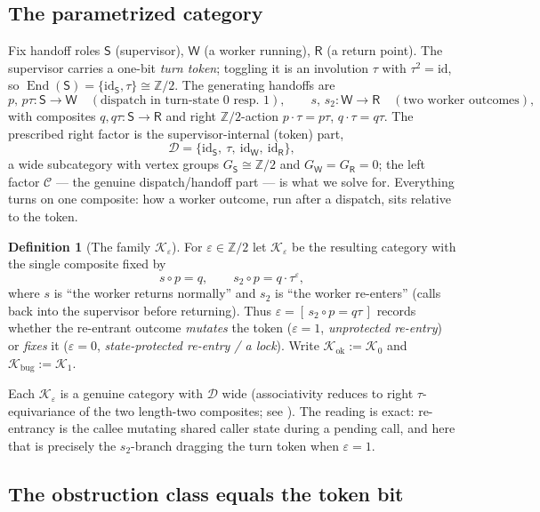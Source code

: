 \documentclass[11pt]{amsart}
\theoremstyle{definition}
\newtheorem{definition}[theorem]{Definition}
\theoremstyle{remark}
\newcommand{\End}{\operatorname{End}}
\newcommand{\id}{\mathrm{id}}
\newcommand{\C}{\mathcal{C}}
\newcommand{\D}{\mathcal{D}}
\newcommand{\K}{\mathcal{K}}
\newcommand{\Sup}{\mathsf{S}}
\newcommand{\Wk}{\mathsf{W}}
\newcommand{\Rt}{\mathsf{R}}
\begin{document}
\subsection*{The parametrized category}
Fix handoff roles $\Sup$ (supervisor), $\Wk$ (a worker running), $\Rt$ (a return point). The
supervisor carries a one-bit \emph{turn token}; toggling it is an involution $\tau$ with
$\tau^2=\id$, so $\End(\Sup)=\{\id_\Sup,\tau\}\cong\mathbb Z/2$. The generating handoffs are
\[
  p,\,p\tau:\Sup\to\Wk\quad(\text{dispatch in turn-state $0$ resp.\ $1$}),
  \qquad
  s,\,s_2:\Wk\to\Rt\quad(\text{two worker outcomes}),
\]
with composites $q,q\tau:\Sup\to\Rt$ and right $\mathbb Z/2$-action $p\cdot\tau=p\tau$,
$q\cdot\tau=q\tau$. The prescribed right factor is the supervisor-internal (token) part,
\[
  \D=\{\id_\Sup,\ \tau,\ \id_\Wk,\ \id_\Rt\},
\]
a wide subcategory with vertex groups $G_\Sup\cong\mathbb Z/2$ and $G_\Wk=G_\Rt=0$; the left
factor $\C$ --- the genuine dispatch/handoff part --- is what we solve for. Everything turns on
one composite: how a worker outcome, run after a dispatch, sits relative to the token.

\begin{definition}[The family $\K_\varepsilon$]\label{def:regimes}
For $\varepsilon\in\mathbb Z/2$ let $\K_\varepsilon$ be the resulting category with the single
composite fixed by
\[
  s\circ p=q,\qquad s_2\circ p=q\cdot\tau^{\varepsilon},
\]
where $s$ is ``the worker returns normally'' and $s_2$ is ``the worker re-enters'' (calls back
into the supervisor before returning). Thus $\varepsilon=[\,s_2\circ p=q\tau\,]$ records whether
the re-entrant outcome \emph{mutates} the token ($\varepsilon=1$, \emph{unprotected re-entry}) or
\emph{fixes} it ($\varepsilon=0$, \emph{state-protected re-entry / a lock}). Write
$\K_{\mathrm{ok}}:=\K_0$ and $\K_{\mathrm{bug}}:=\K_1$.
\end{definition}

Each $\K_\varepsilon$ is a genuine category with $\D$ wide (associativity reduces to right
$\tau$-equivariance of the two length-two composites; see \cite{analytic}). The reading is
exact: re-entrancy is the callee mutating shared caller state during a pending call, and here
that is precisely the $s_2$-branch dragging the turn token when $\varepsilon=1$.

\subsection*{The obstruction class equals the token bit}
\end{document}

